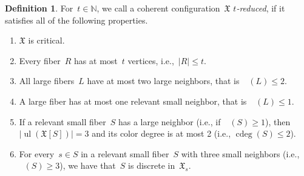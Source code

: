 \documentclass[english,a4paper]{article}
\theoremstyle{plain}
\theoremstyle{definition}
\newtheorem{definition} [theorem]{Definition}
\newcommand{\Nat}{\ensuremath{\mathbb{N}}}
\newcommand{\coherentConfig}{\ensuremath{\mathfrak{X}}}
\newcommand{\inducedCC}[1]{\ensuremath{\coherentConfig[#1]}}
\DeclareMathOperator*{\ul}{ul}
\DeclareMathOperator{\ColorDeg}{cdeg}
\DeclareMathOperator{\ColorDegLarge}{cdeg_L}
\DeclareMathOperator{\ColorDegSmall}{cdeg_S}
\DeclareMathOperator{\ColorDegRelevantSmall}{cdeg_{rS}}
\newcommand{\colorDeg}[1]{\ensuremath{\ColorDeg\left(#1\right)}}
\newcommand{\colorDegLarge}[1]{\ensuremath{\ColorDegLarge\left(#1\right)}}
\newcommand{\colorDegSmall}[1]{\ensuremath{\ColorDegSmall\left(#1\right)}}
\newcommand{\colorDegRelevantSmall}[1]{\ensuremath{\ColorDegRelevantSmall\left(#1\right)}}
\begin{document}
\begin{definition}
\label{new:global-argument:assumption}
    For~$t\in \Nat$, we call a coherent configuration~$\coherentConfig$ \emph{$t$-reduced}, if it satisfies all of the following properties.
    \begin{enumerate}
        \item \label{new:global-argument:assumption:critical}
        $\coherentConfig$ is critical.
        \item \label{new:global-argument:assumption:limited-fiber-size}
        Every fiber~$R$ has at most~$t$ vertices, i.e.,~$|R|\leq t$.
        \item \label{new:global-argument:assumption:large-colorDeg}
        All large fibers~$L$ have at most two large neighbors, that is~$\colorDegLarge{L} \leq 2$.
        \item \label{new:global-argument:assumption:large-one-relevent}
        A large fiber has at most one relevant small neighbor, that is~$\colorDegRelevantSmall{L} \leq 1$.
        \item \label{new:global-argument:assumption:relevant-2-neighbors}
        If a relevant small fiber~$S$ has a large neighbor (i.e., if~$\colorDegLarge{S}\geq 1$), then~$|\ul(\inducedCC{S})| = 3$ and its color degree is at most 2 (i.e., $\colorDeg{S}\leq 2$).
        \item \label{new:global-argument:assumption:relevant-3-neighbors}
        For every~$s\in S$ in a relevant small fiber~$S$ with three small neighbors (i.e.,~$\colorDegSmall{S}\geq 3$), we have that~$S$ is discrete in~$\coherentConfig_s$.
    \end{enumerate}
\end{definition}
\end{document}
